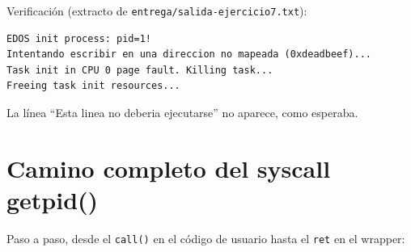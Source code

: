 \documentclass[11pt,a4paper]{article}
\begin{document}
Verificación (extracto de \texttt{entrega/salida-ejercicio7.txt}):

\begin{lstlisting}[style=textstyle]
EDOS init process: pid=1!
Intentando escribir en una direccion no mapeada (0xdeadbeef)...
Task init in CPU 0 page fault. Killing task...
Freeing task init resources...
\end{lstlisting}

La línea ``Esta linea no deberia ejecutarse'' no aparece, como esperaba.

\section{Camino completo del syscall getpid()}

Paso a paso, desde el \texttt{call()} en el código de usuario hasta el
\texttt{ret} en el wrapper:
\end{document}
